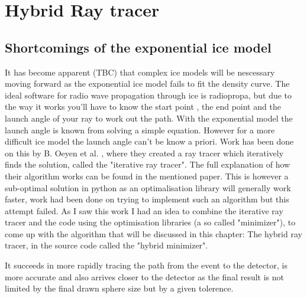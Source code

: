 \documentclass[11pt,a4paper,faculty=we,language=en,doctype=report]{cls/ugent-doc}
\begin{document}
\chapter{Hybrid Ray tracer}
\section{Shortcomings of the exponential ice model}
It has become apparent (TBC) that complex ice models
will be nescessary moving forward as the exponential ice model fails
to fit the density curve.  The ideal software for radio wave
propagation through ice is radiopropa\cite{Winchen_2019}, but due to
the way it works you'll have to know the start point , the end point
and the launch angle of your ray to work out the path. With the
exponential model the launch angle is known from solving a simple
equation.  However for a more difficult ice model the launch angle
can't be know a priori.  Work has been done on this by B. Oeyen et
al. \cite{2022icrc.confE1027O}, where they created a ray tracer
which iteratively finds the solution, called the "iterative ray
tracer".  The full explanation of how their algorithm works can be
found in the mentioned paper.  This is however a sub-optimal
solution in python as an optimalisation library will generally work
faster, work had been done on trying to implement such an algorithm
but this attempt failed.  As I saw this work I had an idea to
combine the iterative ray tracer and the code using the optimisation
libraries (a so called "minimizer"), to come up with the algorithm
that will be discussed in this chapter: The hybrid ray tracer, in
the source code called the "hybrid minimizer".

It succeeds in more rapidly tracing the path from the event to the
detector, is more accurate and also arrives closer to the detector
as the final result is not limited by the final drawn sphere size
but by a given tolerence.
\end{document}
